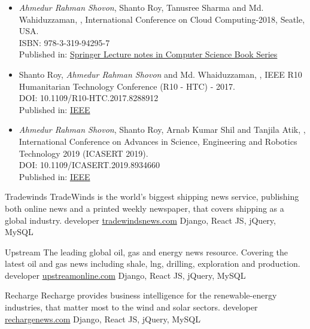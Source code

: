 \documentclass[10pt,a4paper]{altacv}
\begin{document}
\begin{itemize}
\item \emph{Ahmedur Rahman Shovon}, Shanto Roy, Tanusree Sharma and Md. Wahiduzzaman, , International Conference on Cloud Computing-2018, Seatle, USA. 
\\
ISBN: 978-3-319-94295-7
\\
Published in: \href{https://link.springer.com/chapter/10.1007%2F978-3-319-94295-7_19}{Springer Lecture notes in Computer Science Book Series}

\divider
\item Shanto Roy, \emph{Ahmedur Rahman Shovon} and Md. Whaiduzzaman, , IEEE R10 Humanitarian Technology Conference (R10 - HTC) - 2017. 
\\ 
DOI: 10.1109/R10-HTC.2017.8288912
\\
Published in: \href{https://ieeexplore.ieee.org/document/8288912/}{IEEE}

\divider
\item \emph{Ahmedur Rahman Shovon}, Shanto Roy, Arnab Kumar Shil and Tanjila Atik, , International Conference on Advances in Science, Engineering and Robotics Technology 2019 (ICASERT 2019). 
\\ 
DOI: 10.1109/ICASERT.2019.8934660
\\
Published in: \href{https://ieeexplore.ieee.org/document/8934660}{IEEE}
\end{itemize}
\medskip
{}
\cvproject
{Tradewinds}
{TradeWinds is the world's biggest shipping news service, publishing both online news and a printed weekly newspaper, that covers shipping as a global industry.}
{developer}
{\href{http://www.tradewindsnews.com/}{tradewindsnews.com}}
{Django, React JS, jQuery, MySQL}
\divider

\cvproject
{Upstream}
{The leading global oil, gas and energy news resource. Covering the latest oil and gas news including shale, lng, drilling, exploration and production.}
{developer}
{\href{http://www.upstreamonline.com/}{upstreamonline.com}}
{Django, React JS, jQuery, MySQL}
\divider

\cvproject
{Recharge}
{Recharge provides business intelligence for the renewable-energy industries, that matter most to the wind and solar sectors.}
{developer}
{\href{http://www.rechargenews.com/}{rechargenews.com}}
{Django, React JS, jQuery, MySQL}
\divider
\end{document}
